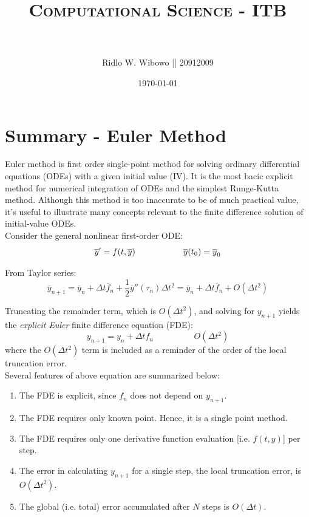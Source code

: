 \documentclass[paper=a4, fontsize=11pt]{scrartcl}
\title{	
\normalfont \normalsize 
\textsc{Computational Science - ITB} \\ [25pt] %
\horrule{0.5pt} \\[0.4cm] %
}
\author{\small{Ridlo W. Wibowo || 20912009}} %
\date{\normalsize\today} %
\numberwithin{equation}{section} %
\numberwithin{figure}{section} %
\numberwithin{table}{section} %
\begin{document}
\maketitle %

\section{Summary - Euler Method}
Euler method is first order single-point method for solving ordinary differential equations (ODEs) with a given initial value (IV). It is the most bacic explicit method for numerical integration of ODEs and the simplest Runge-Kutta method. Although this method is too inaccurate to be of much practical value, it's useful to illustrate many concepts relevant to the finite difference solution of initial-value ODEs.
\\
Consider the general nonlinear first-order ODE:\\
\begin{equation}
\overline{y}' = f(t, \overline{y})  \hspace{2.0cm} \overline{y}(t_{0}) = \overline{y}_{0}
\end{equation}

From Taylor series:
\begin{equation}
\overline{y}_{n+1} = \overline{y}_{n} + \Delta t \overline{f}_{n} + \dfrac{1}{2} \overline{y}'' (\tau_{n}) \Delta t^{2} = \overline{y}_{n} + \Delta t \overline{f}_{n} + O(\Delta t^{2})
\end{equation} 

Truncating the remainder term, which is $ O(\Delta t^{2}) $, and solving for $ y_{n+1} $ yields the \textit{explicit Euler} finite difference equation (FDE):
\begin{equation}
y_{n+1} = y_{n} + \Delta t f_{n}  \hspace{2cm} O(\Delta t^{2})
\end{equation}
where the $ O(\Delta t^{2}) $ term is included as a reminder of the order of the local truncation error.\\
Several features of above equation are summarized below:
\begin{enumerate}
\item The FDE is explicit, since $f_{n}$ does not depend on $y_{n+1}$.
\item The FDE requires only known point. Hence, it is a single point method.
\item The FDE requires only one derivative function evaluation [i.e. $f(t,y)$] per step.
\item The error in calculating $y_{n+1}$ for a single step, the local truncation error, is $O(\Delta t^{2})$.
\item The global (i.e. total) error accumulated after $N$ steps is $O(\Delta t)$.
\end{enumerate}
\end{document}
